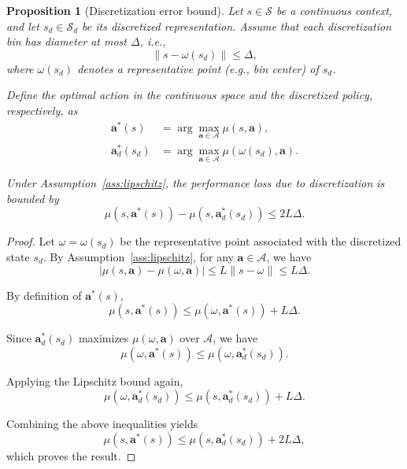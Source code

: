 \documentclass[10pt,a4paper]{amsart}
\newtheorem{proposition}{Proposition}
\begin{document}
\begin{proposition}[Discretization error bound]
\label{prop:discretization}
Let $s \in \mathcal{S}$ be a continuous context, and let $s_d \in \mathcal{S}_d$ be its discretized representation.
Assume that each discretization bin has diameter at most $\Delta$, i.e.,
\[
\| s - \omega(s_d) \| \le \Delta,
\]
where $\omega(s_d)$ denotes a representative point (e.g., bin center) of $s_d$.

Define the optimal action in the continuous space and the discretized policy, respectively, as
\begin{equation*}
\begin{aligned}
\mathbf{a}^*(s) &= \arg\max_{\mathbf{a} \in \mathcal{A}} \mu(s,\mathbf{a}), \\ \mathbf{a}_d^*(s_d) &= \arg\max_{\mathbf{a} \in \mathcal{A}} \mu(\omega(s_d), \mathbf{a}).
\end{aligned}
\end{equation*}


Under Assumption~\ref{ass:lipschitz}, the performance loss due to discretization is bounded by
\begin{equation}
\label{eq:discretization_bound}
\mu(s, \mathbf{a}^*(s)) - \mu(s, \mathbf{a}_d^*(s_d)) \le 2 L \Delta.
\end{equation}
\end{proposition}

\begin{proof}
Let $\omega = \omega(s_d)$ be the representative point associated with the discretized state $s_d$.
By Assumption~\ref{ass:lipschitz}, for any $\mathbf{a} \in \mathcal{A}$, we have
\begin{equation}
\label{eq:lipschitz_step}
|\mu(s,\mathbf{a}) - \mu(\omega,\mathbf{a})| \le L \| s - \omega \| \le L \Delta.
\end{equation}

By definition of $\mathbf{a}^*(s)$,
\[
\mu(s,\mathbf{a}^*(s)) \le \mu(\omega,\mathbf{a}^*(s)) + L\Delta.
\]

Since $\mathbf{a}_d^*(s_d)$ maximizes $\mu(\omega,\mathbf{a})$ over $\mathcal{A}$, we have
\[
\mu(\omega,\mathbf{a}^*(s)) \le \mu(\omega,\mathbf{a}_d^*(s_d)).
\]

Applying the Lipschitz bound again,
\[
\mu(\omega,\mathbf{a}_d^*(s_d)) \le \mu(s,\mathbf{a}_d^*(s_d)) + L\Delta.
\]

Combining the above inequalities yields
\[
\mu(s,\mathbf{a}^*(s)) \le \mu(s,\mathbf{a}_d^*(s_d)) + 2L\Delta,
\]
which proves the result.
\end{proof}
\end{document}
